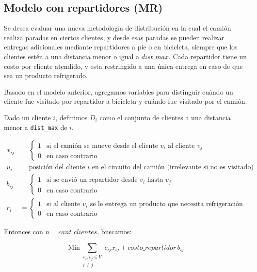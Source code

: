 \documentclass[10pt]{article}
\begin{document}
\subsection{Modelo con repartidores (MR)}

Se desea evaluar una nueva metodología de distribución en la cual el camión realiza paradas en ciertos clientes, y desde esas paradas se pueden realizar entregas adicionales mediante repartidores a pie o en bicicleta, siempre que los clientes estén a una distancia menor o igual a $dist\_max$. Cada repartidor tiene un costo por cliente atendido, y esta restringido a una única entrega en caso de que sea un producto refrigerado.


Basado en el modelo anterior, agregamos variables para distinguir cuándo un cliente fue visitado por repartidor a bicicleta y cuándo fue visitado por el camión.

	\vspace{5mm}

	Dado un cliente $i$, definimos $D_i$ como el conjunto de clientes a una distancia menor a \texttt{dist\_max} de $i$.
	
	\begin{align*}
		x_{ij} &= 
		\begin{cases}
			1 & \text{si el camión se mueve desde el cliente $v_i$ al cliente $v_j$} \\
			0 & \text{en caso contrario}
		\end{cases} \\[1em]
		u_i &= \text{posición del cliente $i$ en el circuito del camión (irrelevante si no es visitado)} \\[1em]
		b_{ij} &= 
		\begin{cases}
			1 & \text{si se envió un repartidor desde $v_i$ hasta $v_j$} \\
			0 & \text{en caso contrario}
		\end{cases} \\[1em]
		r_i &=
		\begin{cases}
			1 & \text{si al cliente $v_i$ se le entrega un producto que necesita refrigeración} \\
			0 & \text{en caso contrario}
		\end{cases}
	\end{align*}
	
\vspace{5mm}

	Entonces con $n = cant\_clientes$, buscamos:

	\[
		\text{Min} \sum_{\substack{v_i, v_j \in V \\ i \neq j}} c_{ij} x_{ij} 
		+ costo\_repartidor\, b_{ij}
		\]
\vspace{30mm}
\end{document}
